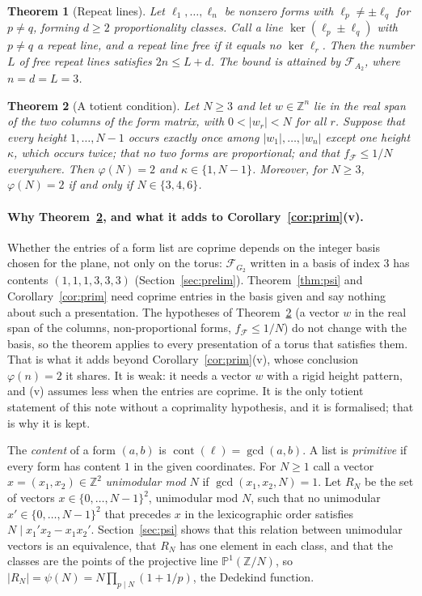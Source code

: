 \documentclass[11pt]{amsart}
\newtheorem{theorem}{Theorem}
\theoremstyle{definition}
\theoremstyle{remark}
\newcommand{\Z}{\mathbb{Z}}
\newcommand{\cont}{\operatorname{cont}}
\begin{document}
\begin{theorem}[Repeat lines]\label{thm:count}
Let $\ell_1,\dots,\ell_n$ be nonzero forms with $\ell_p\ne\pm\ell_q$ for $p\ne q$, forming $d\ge2$ proportionality classes. Call a line $\ker(\ell_p\pm\ell_q)$ with $p\ne q$ a \emph{repeat line}, and a repeat line \emph{free} if it equals no $\ker\ell_r$. Then the number $L$ of free repeat lines satisfies $2n\le L+d$. The bound is attained by $\mathcal F_{A_2}$, where $n=d=L=3$.
\end{theorem}

\begin{theorem}[A totient condition]\label{thm:cryst}
Let $N\ge3$ and let $w\in\Z^n$ lie in the real span of the two columns of the form matrix, with $0<|w_r|<N$ for all $r$. Suppose that every height $1,\dots,N-1$ occurs exactly once among $|w_1|,\dots,|w_n|$ except one height $\kappa$, which occurs twice; that no two forms are proportional; and that $f_{\mathcal F}\le 1/N$ everywhere. Then $\varphi(N)=2$ and $\kappa\in\{1,N-1\}$. Moreover, for $N\ge3$, $\varphi(N)=2$ if and only if $N\in\{3,4,6\}$.
\end{theorem}

\paragraph{Why Theorem~\ref{thm:cryst}, and what it adds to Corollary~\ref{cor:prim}(v).}
Whether the entries of a form list are coprime depends on the integer basis chosen for the plane, not only on the torus: $\mathcal F_{G_2}$ written in a basis of index $3$ has contents $(1,1,1,3,3,3)$ (Section~\ref{sec:prelim}). Theorem~\ref{thm:psi} and Corollary~\ref{cor:prim} need coprime entries in the basis given and say nothing about such a presentation. The hypotheses of Theorem~\ref{thm:cryst} (a vector $w$ in the real span of the columns, non-proportional forms, $f_{\mathcal F}\le1/N$) do not change with the basis, so the theorem applies to every presentation of a torus that satisfies them. That is what it adds beyond Corollary~\ref{cor:prim}(v), whose conclusion $\varphi(n)=2$ it shares. It is weak: it needs a vector $w$ with a rigid height pattern, and (v) assumes less when the entries are coprime. It is the only totient statement of this note without a coprimality hypothesis, and it is formalised; that is why it is kept.

The \emph{content} of a form $(a,b)$ is $\cont(\ell)=\gcd(a,b)$. A list is \emph{primitive} if every form has content $1$ in the given coordinates. For $N\ge1$ call a vector $x=(x_1,x_2)\in\Z^2$ \emph{unimodular mod $N$} if $\gcd(x_1,x_2,N)=1$. Let $R_N$ be the set of vectors $x\in\{0,\dots,N-1\}^2$, unimodular mod $N$, such that no unimodular $x'\in\{0,\dots,N-1\}^2$ that precedes $x$ in the lexicographic order satisfies $N\mid x_1'x_2-x_1x_2'$. Section~\ref{sec:psi} shows that this relation between unimodular vectors is an equivalence, that $R_N$ has one element in each class, and that the classes are the points of the projective line $\mathbb P^1(\Z/N)$, so $|R_N|=\psi(N)=N\prod_{p\mid N}(1+1/p)$, the Dedekind function.
\end{document}
